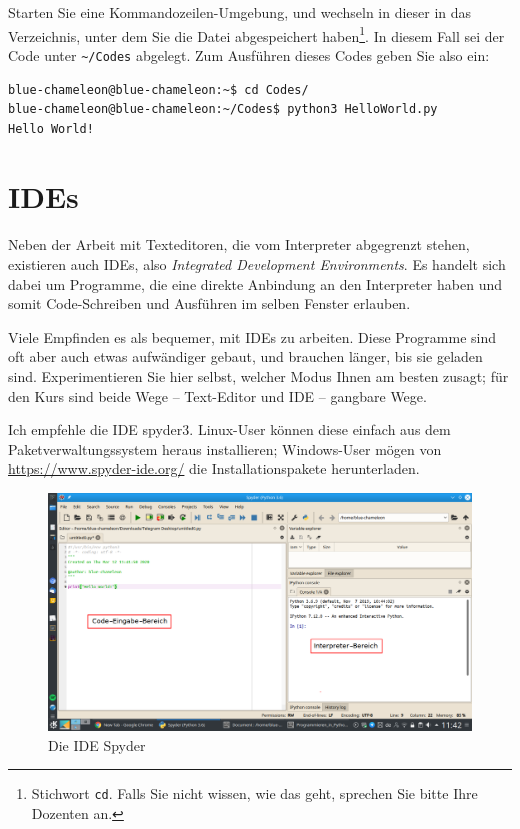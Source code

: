 Starten Sie eine Kommandozeilen-Umgebung, und wechseln in dieser in das Verzeichnis, unter dem Sie die Datei abgespeichert haben\footnote{Stichwort \texttt{cd}. Falls Sie nicht wissen, wie das geht, sprechen Sie bitte Ihre Dozenten an.}. In diesem Fall sei der Code unter \texttt{\textasciitilde/Codes} abgelegt. Zum Ausführen dieses Codes geben Sie also ein:

\begin{cmdbox}
\begin{verbatim}
blue-chameleon@blue-chameleon:~$ cd Codes/
blue-chameleon@blue-chameleon:~/Codes$ python3 HelloWorld.py 
Hello World!
\end{verbatim}
\end{cmdbox}



\section{IDEs}
Neben der Arbeit mit Texteditoren, die vom Interpreter abgegrenzt stehen, existieren auch IDEs, also \emph{Integrated Development Environments}. Es handelt sich dabei um Programme, die eine direkte Anbindung an den Interpreter haben und somit Code-Schreiben und Ausführen im selben Fenster erlauben.

Viele Empfinden es als bequemer, mit IDEs zu arbeiten. Diese Programme sind oft aber auch etwas aufwändiger gebaut, und brauchen länger, bis sie geladen sind. Experimentieren Sie hier selbst, welcher Modus Ihnen am besten zusagt; für den Kurs sind beide Wege -- Text-Editor und IDE -- gangbare Wege.

Ich empfehle die IDE spyder3. Linux-User können diese einfach aus dem Paketverwaltungssystem heraus installieren; Windows-User mögen von \url{https://www.spyder-ide.org/} die Installationspakete herunterladen.

\begin{figure}
	\includegraphics[width=\linewidth]{./gfx/Spyder}
	\caption{Die IDE Spyder} \label{gfx:Spyder}
\end{figure}


